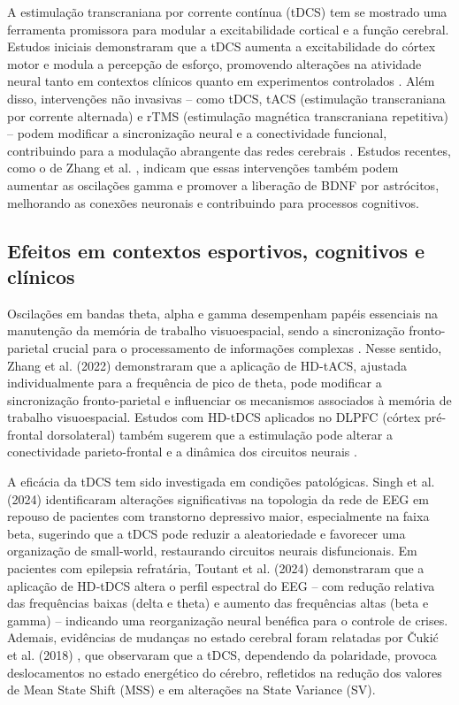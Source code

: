 A estimulação transcraniana por corrente contínua (tDCS) tem se mostrado uma ferramenta promissora para modular a excitabilidade cortical e a função cerebral. Estudos iniciais demonstraram que a tDCS aumenta a excitabilidade do córtex motor e modula a percepção de esforço, promovendo alterações na atividade neural tanto em contextos clínicos quanto em experimentos controlados \cite{nitsche2000excitability, okano2013estimulacao}. Além disso, intervenções não invasivas – como tDCS, tACS (estimulação transcraniana por corrente alternada) e rTMS (estimulação magnética transcraniana repetitiva) – podem modificar a sincronização neural e a conectividade funcional, contribuindo para a modulação abrangente das redes cerebrais \cite{scheler2019neuromodulation, kunze2014high}. Estudos recentes, como o de Zhang et al. \cite{zhang2024closed}, indicam que essas intervenções também podem aumentar as oscilações gamma e promover a liberação de BDNF por astrócitos, melhorando as conexões neuronais e contribuindo para processos cognitivos.

\subsection{Efeitos em contextos esportivos, cognitivos e clínicos}

Oscilações em bandas theta, alpha e gamma desempenham papéis essenciais na manutenção da memória de trabalho visuoespacial, sendo a sincronização fronto-parietal crucial para o processamento de informações complexas \cite{fell2011, fries2015, palva2010}. Nesse sentido, Zhang et al. (2022) \cite{zhang2022theta} demonstraram que a aplicação de HD-tACS, ajustada individualmente para a frequência de pico de theta, pode modificar a sincronização fronto-parietal e influenciar os mecanismos associados à memória de trabalho visuoespacial. Estudos com HD-tDCS aplicados no DLPFC (córtex pré-frontal dorsolateral) também sugerem que a estimulação pode alterar a conectividade parieto-frontal e a dinâmica dos circuitos neurais \cite{arif2021high}.

A eficácia da tDCS tem sido investigada em condições patológicas. Singh et al. (2024) \cite{singh2024evaluating} identificaram alterações significativas na topologia da rede de EEG em repouso de pacientes com transtorno depressivo maior, especialmente na faixa beta, sugerindo que a tDCS pode reduzir a aleatoriedade e favorecer uma organização de small-world, restaurando circuitos neurais disfuncionais. Em pacientes com epilepsia refratária, Toutant et al. (2024) \cite{toutant2024hdtdcs} demonstraram que a aplicação de HD‑tDCS altera o perfil espectral do EEG – com redução relativa das frequências baixas (delta e theta) e aumento das frequências altas (beta e gamma) – indicando uma reorganização neural benéfica para o controle de crises. Ademais, evidências de mudanças no estado cerebral foram relatadas por Čukić et al. (2018) \cite{cukic2018shift}, que observaram que a tDCS, dependendo da polaridade, provoca deslocamentos no estado energético do cérebro, refletidos na redução dos valores de Mean State Shift (MSS) e em alterações na State Variance (SV).

